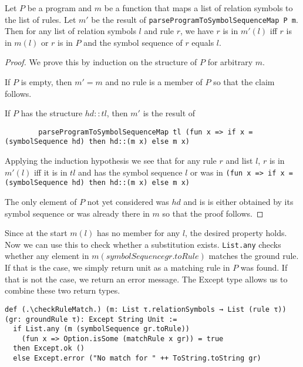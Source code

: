 \begin{lemma}[\parseProgramToSymbolSequenceMapmem]\label{lem:parseProgramToSymbolSequenceMap}
    Let $P$ be a program and $m$ be a function that maps a list of relation symbols to the list of rules. Let $m'$ be the result of \lstinline|parseProgramToSymbolSequenceMap P m|. Then for any list of relation symbols $l$ and rule $r$, we have $r$ is in $m'(l)$ iff $r$ is in $m(l)$ or $r$ is in $P$ and the symbol sequence of $r$ equals $l$.
\end{lemma}
\begin{proof}
    We prove this by induction on the structure of $P$ for arbitrary $m$.

    If $P$ is empty, then $m' = m$ and no rule is a member of $P$ so that the claim follows.

    If $P$ has the structure $hd::tl$, then $m'$ is the result of 

    \begin{lstlisting}
        parseProgramToSymbolSequenceMap tl (fun x => if x = (symbolSequence hd) then hd::(m x) else m x)
    \end{lstlisting}

    Applying the induction hypothesis we see that for any rule $r$ and list $l$, $r$ is in $m'(l)$ iff it is in $tl$ and has the symbol sequence $l$ or was in \lstinline|(fun x => if x = (symbolSequence hd) then hd::(m x) else m x)|

    The only element of $P$ not yet considered was $hd$ and is is either obtained by its symbol sequence or was already there in $m$ so that the proof follows.
\end{proof}

Since at the start $m(l)$ has no member for any $l$, the desired property holds. Now we can use this to check whether a substitution exists. \lstinline|List.any| checks whether any element in $m(symbolSequence gr.toRule)$ matches the ground rule. If that is the case, we simply return unit as a matching rule in $P$ was found. If that is not the case, we return an error message. The Except type allows us to combine these two return types.

\begin{lstlisting}
def (.\checkRuleMatch.) (m: List τ.relationSymbols → List (rule τ)) (gr: groundRule τ): Except String Unit :=
  if List.any (m (symbolSequence gr.toRule)) 
    (fun x => Option.isSome (matchRule x gr)) = true
  then Except.ok ()
  else Except.error ("No match for " ++ ToString.toString gr)
\end{lstlisting}

